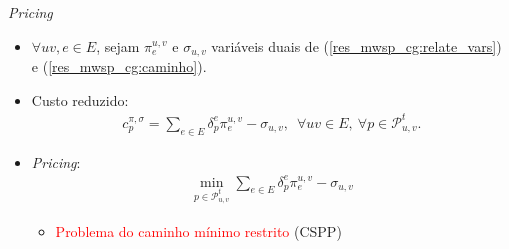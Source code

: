 \documentclass[dvipsnames]{beamer}
\newcommand{\spanPath}{\mathcal{P}}
\newcommand{\Pathuv}{\spanPath_{u,v}^{t}}
\newcommand{\FullPrimalPL}{\rm{(1)}}
\newcommand{\FullDualPL}{\rm{(3)}}
\begin{document}

  

\begin{frame}{\emph{Pricing}
  }
  \hypertarget{pricing}{}
  \begin{itemize}

    \item $\forall uv, e \in E$, sejam $\pi^{u,v}_{e}$ e $\sigma_{u,v}$
    variáveis duais de (\ref{res_mwsp_cg:relate_vars}) e
    (\ref{res_mwsp_cg:caminho}).
    
    \item <2->Custo reduzido:
\begin{align*}
  c^{\pi, \sigma}_{p} = \sum_{e \in E} \delta^{e}_{p}\pi^{u,v}_{e} - \sigma_{u,v}, \:\; \forall uv \in E, \: \forall p \in \Pathuv.
\end{align*}
\item <2->\emph{Pricing}:
\begin{align*}
  \min_{p \in \Pathuv}\sum_{e \in E} \delta^{e}_{p}\pi^{u,v}_{e} - \sigma_{u,v}
\end{align*}
\begin{itemize}
  \item <3->\textcolor{red}{Problema do caminho mínimo restrito} (CSPP)
  \end{itemize}

  \end{itemize}
  
  \end{frame}
\end{document}
